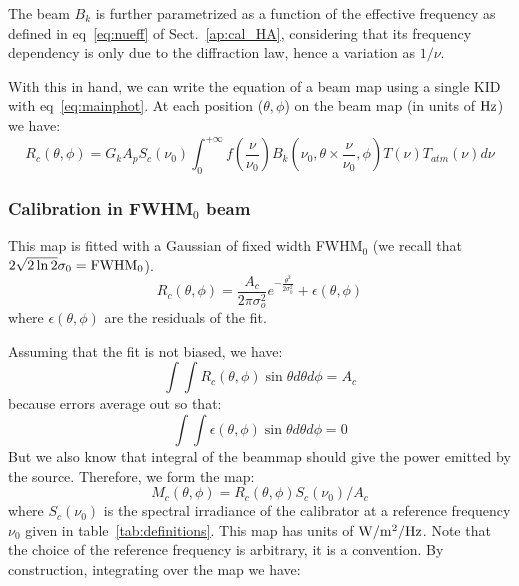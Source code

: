 The beam $B_{k}$ is further parametrized as a function
of the effective frequency as defined in eq~\ref{eq:nueff} of Sect.~\ref{ap:cal_HA},
considering that its frequency dependency is only due to the diffraction law,
hence a variation as $1/\nu$.

With this in hand, we can write the equation of a beam map using a
single KID with eq~\ref{eq:mainphot}. At each position ($\theta, \phi$)
on the beam map (in units of $\rm Hz$) we have:
\begin{equation}
R_{c}(\theta, \phi) =  G_{k} A_{p} S_{c} (\nu_{0})  \int_{0}^{+\infty}
f(\frac{\nu}{\nu_{0}}) B_{k}(\nu_{0}, \theta \times \frac{\nu}{\nu_{0}},
\phi) T(\nu) T_{atm}(\nu) d\nu
\label{eq:beammap}
\end{equation}

\subsubsection{Calibration in FWHM$_{0}$ beam}

This map is fitted with a Gaussian of fixed width FWHM$_{0}$ (we
recall that $2 \sqrt{2\ln{2}} \sigma_{0} =  {\rm FWHM}_{0}$).
\begin{equation} 
R_{c}(\theta, \phi) = \frac{A_{c}}{2 \pi \sigma_{o}^{2}}
e^{-\frac{\theta^{2}}{2\sigma_{0}^{2}}}  + \epsilon(\theta, \phi)
\end{equation}
where $\epsilon(\theta, \phi)$ are the residuals of the fit.

Assuming that the fit is not biased, we have:
\begin{equation} 
\int\int R_{c}(\theta, \phi) \sin \theta d\theta d\phi = A_{c}
\end{equation}
because errors average out so that:
\begin{equation} 
\int\int \epsilon (\theta, \phi) \sin \theta d\theta d\phi = 0
\end{equation}
But we also know that integral of the beammap should give the power
emitted by the source. Therefore, we form the map:
\begin{equation}
M_{c}(\theta, \phi) = R_{c}(\theta, \phi)   S_{c} (\nu_{0}) / A_{c}
\end{equation}
where  $S_{c} (\nu_{0})$ is the spectral irradiance of the calibrator
at a reference frequency $\nu_{0}$ given in
table~\ref{tab:definitions}. This map has units of $\rm W/m^{2}/Hz$. Note
that the choice of the reference frequency is arbitrary, it is a
convention. By construction, integrating over the map we have:

